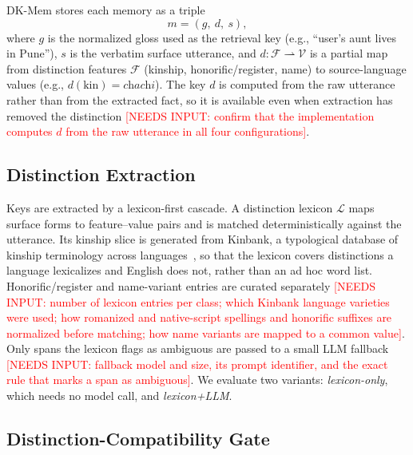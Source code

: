 \documentclass[conference]{IEEEtran}
\newcommand{\pending}[1]{\textcolor{red}{#1}}
\begin{document}
DK-Mem stores each memory as a triple
\begin{equation}
m = (g,\ d,\ s),
\label{eq:entry}
\end{equation}
where $g$ is the normalized gloss used as the retrieval key (e.g.,
``user's aunt lives in Pune''), $s$ is the verbatim surface utterance, and
$d : \mathcal{F} \rightharpoonup \mathcal{V}$ is a partial map from
distinction features $\mathcal{F}$ (kinship, honorific/register, name) to
source-language values (e.g., $d(\text{kin}) = \textit{chachi}$). The key
$d$ is computed from the raw utterance rather than from the extracted
fact, so it is available even when extraction has removed the distinction
\pending{[NEEDS INPUT: confirm that the implementation computes $d$ from
the raw utterance in all four configurations]}.

\subsection{Distinction Extraction}

Keys are extracted by a lexicon-first cascade. A distinction lexicon
$\mathcal{L}$ maps surface forms to feature--value pairs and is matched
deterministically against the utterance. Its kinship slice is generated
from Kinbank, a typological database of kinship terminology across
languages~\cite{kinbank}, so that the lexicon covers distinctions a
language lexicalizes and English does not, rather than an ad hoc word
list. Honorific/register and name-variant entries are curated separately
\pending{[NEEDS INPUT: number of lexicon entries per class; which Kinbank
language varieties were used; how romanized and native-script spellings
and honorific suffixes are normalized before matching; how name variants
are mapped to a common value]}.
Only spans the lexicon flags as ambiguous are passed to a small LLM
fallback
\pending{[NEEDS INPUT: fallback model and size, its prompt identifier, and
the exact rule that marks a span as ambiguous]}. We evaluate two variants:
\emph{lexicon-only}, which needs no model call, and \emph{lexicon+LLM}.

\subsection{Distinction-Compatibility Gate}
\end{document}
